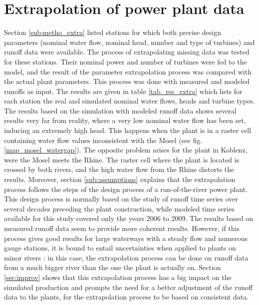 \section{Extrapolation of power plant data}
\label{sec:missing_data}
Section \ref{sub:metho_extra} listed stations for which both precise design parameters (nominal water flow, nominal head, number and type of turbines) and runoff data were available. The process of extrapolating missing data was tested for these stations. Their nominal power and number of turbines were fed to the model, and the result of the parameter extrapolation process was compared with the actual plant parameters. This process was done with measured and modeled runoffs as input. The results are given in table \ref{tab_res_extra} which lists for each station the real and simulated nominal water flows, heads and turbine types. \newline
The results based on the simulation with modeled runoff data shows several results very far from reality, where a very low nominal water flow has been set, inducing an extremely high head. This happens when the plant is in a raster cell containing water flow values inconsistent with the Mosel (see fig. \ref{map_mosel_watergap}). The opposite problem arises for the plant in Koblenz, were the Mosel meets the Rhine. The raster cell where the plant is located is crossed by both rivers, and the high water flow from the Rhine distorts the results. Moreover, section \ref{sub:assumptions} explains that the extrapolation process follows the steps of the design process of a run-of-the-river power plant. This design process is normally based on the study of runoff time series over several decades preceding the plant construction, while modeled time series available for this study covered only the years 2006 to 2009. \newline
The results based on measured runoff data seem to provide more coherent results. However, if this process gives good results for large waterways with a steady flow and numerous gauge stations, it is bound to entail uncertainties when applied to plants on minor rivers : in this case, the extrapolation process can be done on runoff data from a much bigger river than the one the plant is actually on.\newline
Section \ref{sec:improv} shows that this extrapolation process has a big impact on the simulated production and prompts the need for a better adjustment of the runoff data to the plants, for the extrapolation process to be based on consistent data.



